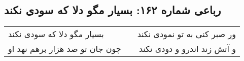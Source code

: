 \begin{center}
\section*{رباعی شماره ۱۶۲: بسیار مگو دلا که سودی نکند}
\label{sec:sh162}
\begin{longtable}{l p{0.5cm} r}
بسیار مگو دلا که سودی نکند
&&
ور صبر کنی به تو نمودی نکند
\\
چون جان تو صد هزار برهم نهد او
&&
و آتش زند اندرو و دودی نکند
\\
\end{longtable}
\end{center}
